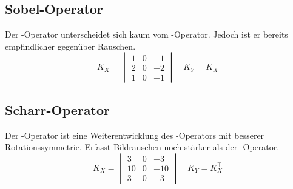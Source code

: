 \subsection*{Sobel-Operator}
Der -Operator unterscheidet sich kaum vom -Operator.
Jedoch ist er bereits empfindlicher gegenüber Rauschen.
  \[ K_X = \begin{vmatrix}
       1 & 0 & -1 \\
       2 & 0 & -2 \\
       1 & 0 & -1
     \end{vmatrix}
     \quad K_Y = K_X^\top \]

\subsection*{Scharr-Operator}
Der -Operator ist eine Weiterentwicklung des -Operators mit besserer Rotationssymmetrie.
Erfasst Bildrauschen noch stärker als der -Operator.
  \[ K_X = \begin{vmatrix}
        3 & 0 & -3 \\
       10 & 0 & -10 \\
        3 & 0 & -3
     \end{vmatrix}
     \quad K_Y = K_X^\top \]

